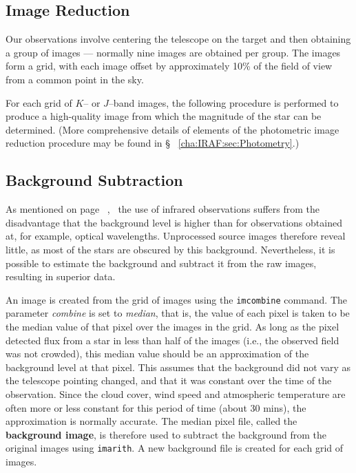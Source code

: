 
\subsection{Image Reduction}\label{cha:InfraredDataReductionTechniques:sec:Photometry:subsec:ImageReduction}

Our observations involve centering the telescope on the target and
then obtaining a group of images --- normally nine images are obtained
per group. The images form a grid, with each image offset by
approximately 10\% of the field of view from a common point in the
sky. %

\vspace{\myparskip}

For each grid of $K$-- or $J$--band images, the following procedure is
performed to produce a high-quality image from which the magnitude of
the star can be determined. (More comprehensive details of elements of the photometric image
reduction procedure may be found in \S~%
\vref{cha:IRAF:sec:Photometry}.) %


\subsection{Background Subtraction}\label{cha:InfraredDataReductionTechniques:sec:Photometry:subsec:BackgroundSubtraction}

As mentioned on page~%
\pageref{cha:InfraredDataReductionTechniques:sec:InfraredAstronomy:subsubsec:Disadvantages},%
\ the use of infrared observations suffers from the disadvantage that
the background level is higher than for observations obtained at, for
example, optical wavelengths. Unprocessed source images therefore
reveal little, as most of the stars are obscured by this
background. Nevertheless, it is possible to estimate the background
and subtract it from the raw images, resulting in superior data. %

\vspace{\myparskip}

An image is created from the grid of images using the
\texttt{imcombine} command. The parameter \textit{combine} is set to
\textit{median}, that is, the value of each pixel is taken to be the
median value of that pixel over the images in the grid. As long as the
pixel detected flux from a star in less than half of the images (i.e.,
the observed field was not crowded), this median value should be an
approximation of the background level at that pixel. This assumes that
the background did not vary as the telescope pointing changed,
and that it was constant over the time of the observation. Since the
cloud cover, wind speed and atmospheric temperature are often more or less constant
for this period of time (about 30 mins), the approximation
is normally accurate. The median pixel file, called the
\textbf{background image}, is therefore used to subtract the background from the original images
using \texttt{imarith}. A new background file is created for each
grid of images. %

